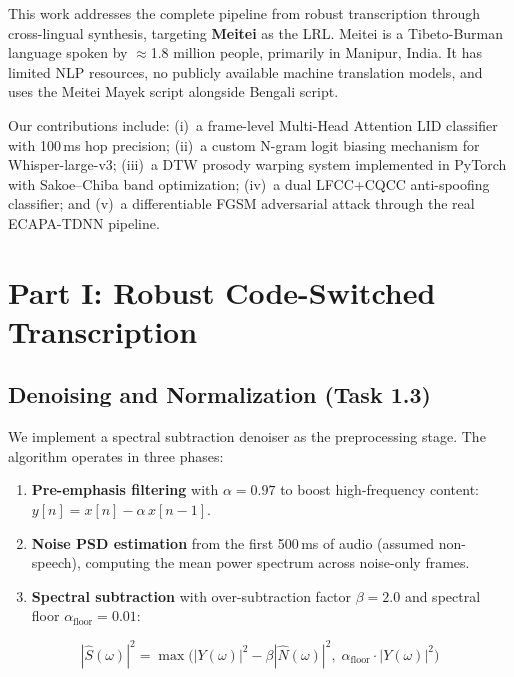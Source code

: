 \documentclass[11pt]{article}
\begin{document}
This work addresses the complete pipeline from robust transcription through
cross-lingual synthesis, targeting \textbf{Meitei} as the LRL.
Meitei is a Tibeto-Burman language spoken by $\approx$1.8 million people,
primarily in Manipur, India. It has limited NLP resources, no publicly
available machine translation models, and uses the Meitei Mayek script
alongside Bengali script.

Our contributions include: (i)~a frame-level Multi-Head Attention LID
classifier with 100\,ms hop precision; (ii)~a custom N-gram logit biasing
mechanism for Whisper-large-v3; (iii)~a DTW prosody warping system
implemented in PyTorch with Sakoe--Chiba band optimization; (iv)~a dual
LFCC+CQCC anti-spoofing classifier; and (v)~a differentiable FGSM
adversarial attack through the real ECAPA-TDNN pipeline.

\section{Part I: Robust Code-Switched Transcription}

\subsection{Denoising and Normalization (Task 1.3)}

We implement a spectral subtraction denoiser as the preprocessing stage.
The algorithm operates in three phases:

\begin{enumerate}
  \item \textbf{Pre-emphasis filtering} with $\alpha=0.97$ to boost
        high-frequency content: $y[n] = x[n] - \alpha\,x[n-1]$.
  \item \textbf{Noise PSD estimation} from the first 500\,ms of audio
        (assumed non-speech), computing the mean power spectrum across
        noise-only frames.
  \item \textbf{Spectral subtraction} with over-subtraction factor
        $\beta=2.0$ and spectral floor $\alpha_{\text{floor}}=0.01$:
\end{enumerate}

\begin{equation}
  |\hat{S}(\omega)|^2 = \max\!\bigl(|Y(\omega)|^2 - \beta|\hat{N}(\omega)|^2,\;
  \alpha_{\text{floor}}\cdot|Y(\omega)|^2\bigr)
\end{equation}
\end{document}
